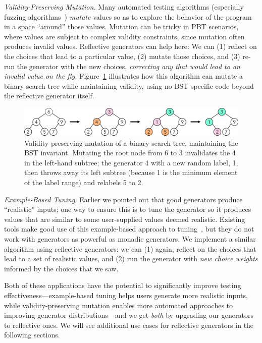 {\em Validity-Preserving Mutation.}
Many automated testing algorithms
(especially fuzzing algorithms~\cite{afl-readme}) {\em mutate} values
so as to explore
the behavior of the program in a space ``around'' those
values. Mutation can be
tricky in PBT scenarios, where values are subject to complex validity
constraints, since mutation often produces invalid values. Reflective
generators can help here: We can (1) reflect on the choices that lead
to a particular
value, (2) mutate those choices, and (3) re-run the generator with the new
choices, {\em correcting any that
would lead to an invalid value on the fly.} Figure~\ref{fig:mutation}
illustrates how this
algorithm can mutate a binary search tree while maintaining validity,
using no BST-specific code beyond the reflective generator itself.
\begin{figure}[t]
  \centering
  \includegraphics[width=.6\textwidth]{assets/mutate-diagram.pdf}
  \vspace{-2mm}
  \caption{Validity-preserving mutation of a binary search tree, maintaining the
  BST invariant. Mutating the root node from 6 to 3 invalidates the
  4 in the left-hand subtree; the generator 4 with a new random label,
1, then throws away its left subtree (because 1 is the
minimum element of the label range) and relabels 5 to 2.}\label{fig:mutation}
\end{figure}

\medskip

{\em Example-Based Tuning.} Earlier we pointed out that good generators
produce ``realistic'' inputs; one way to ensure this is to tune the generator so
it produces values that are similar to some user-supplied values deemed
realistic. Existing tools make good use of this example-based approach to
tuning~\cite{soremekun2020inputs}, but they do not work with generators as
powerful as monadic generators. We implement a similar algorithm using
reflective generators: we can (1) again, reflect on the choices that lead to a
set of realistic values, and (2) run the generator with {\em new choice weights}
informed by the choices that we saw.

Both of these applications have the potential to significantly improve
testing effectiveness---example-based tuning helps users generate more
realistic inputs, while validity-preserving mutation enables more
automated approaches to improving generator distributions---and we get
{\em both} by upgrading our generators to reflective ones. We
will see additional use cases for reflective generators in the
following sections. 

